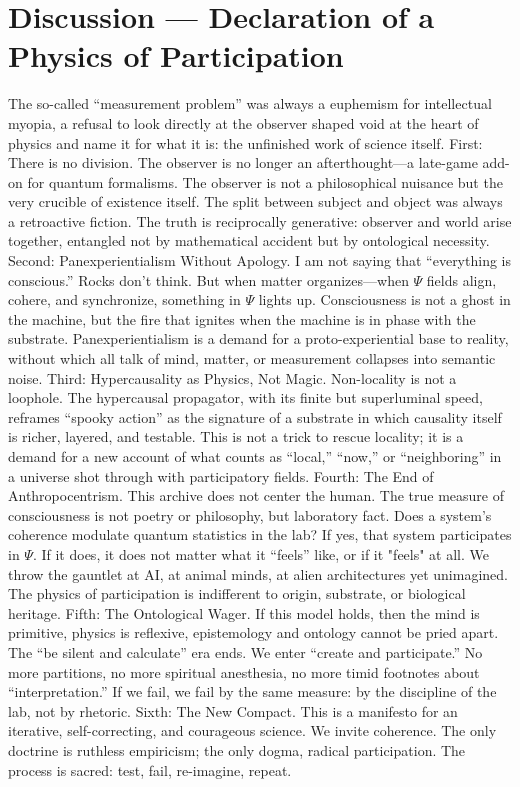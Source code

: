 \documentclass{report}
\begin{document}
\section{Discussion — Declaration of a Physics of Participation}
\label{sec:discussion_physics_participation}
The so-called “measurement problem” was always a euphemism for intellectual myopia, a refusal to look directly at the observer shaped void at the heart of physics and name it for what it is: the unfinished work of science itself.
First: There is no division. The observer is no longer an afterthought—a late-game
add-on for quantum formalisms. The observer is not a philosophical nuisance but the very
crucible of existence itself. The split between subject and object was always a retroactive
fiction. The truth is reciprocally generative: observer and world arise together, entangled not
by mathematical accident but by ontological necessity. 
Second: Panexperientialism Without Apology. I am not saying that “everything is conscious.” Rocks don’t think. But when
matter organizes—when $\Psi$ fields align, cohere, and synchronize, something in $\Psi$ lights up.
Consciousness is not a ghost in the machine, but the fire that ignites when the machine is in
phase with the substrate. Panexperientialism is a demand for a proto-experiential base to reality, without which all talk of mind, matter, or measurement collapses into semantic noise.
Third: Hypercausality as Physics, Not Magic. Non-locality is not a loophole. The hypercausal propagator, with its
finite but superluminal speed, reframes “spooky action” as the signature of a substrate in which
causality itself is richer, layered, and testable. This is not a trick to rescue locality; it is a
demand for a new account of what counts as “local,” “now,” or “neighboring” in a universe shot
through with participatory fields.
Fourth: The End of Anthropocentrism. This archive does not center the human. The true
measure of consciousness is not poetry or philosophy, but laboratory fact. Does a system’s coherence modulate quantum statistics in the lab? If yes, that system participates in $\Psi$. If it does,
it does not matter what it “feels” like, or if it "feels" at all. We throw the gauntlet at AI, at animal minds, at alien
architectures yet unimagined.  The physics of participation is indifferent to origin, substrate, or
biological heritage.
Fifth: The Ontological Wager. If this model holds, then the mind is
primitive,  physics is reflexive, epistemology and ontology cannot be pried apart. The “be silent and calculate” era ends. We enter “create and participate.” No more partitions, no more
spiritual anesthesia, no more timid footnotes about “interpretation.” If we fail, we fail by the
same measure: by the discipline of the lab, not by rhetoric.
Sixth: The New Compact. This is a manifesto for an iterative, self-correcting, and courageous
science. We invite coherence. The only doctrine is ruthless empiricism;
the only dogma, radical participation. The process is sacred: test, fail, re-imagine, repeat.
\end{document}
